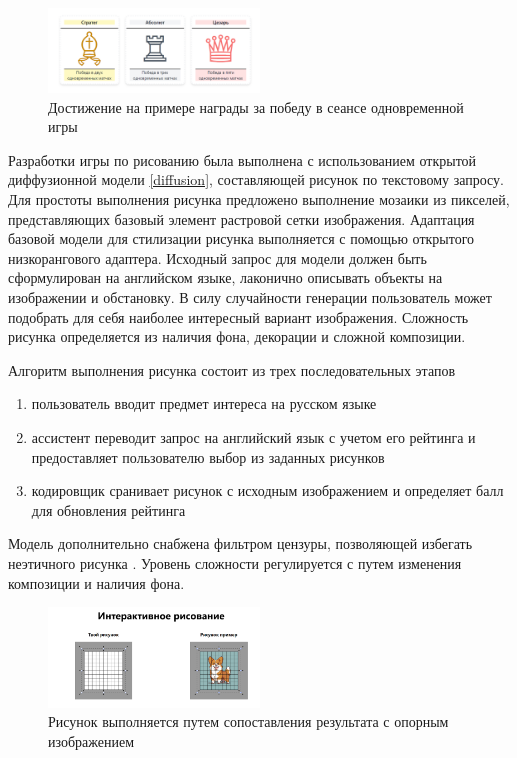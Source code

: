 \begin{figure}[h]
    \centering
    \includegraphics[width=0.5\textwidth]{assets/work/games/achieve.png}
    \caption{Достижение на примере награды за победу в сеансе одновременной игры}
    \label{achievement}
\end{figure}

Разработки игры по рисованию была выполнена с использованием открытой диффузионной модели \ref{diffusion},
составляющей рисунок по текстовому запросу. Для простоты выполнения рисунка предложено выполнение мозаики из
пикселей, представляющих базовый элемент растровой сетки изображения. Адаптация базовой модели для стилизации
рисунка выполняется с помощью открытого низкорангового адаптера. Исходный запрос для модели должен быть 
сформулирован на английском языке, лаконично описывать объекты на изображении и обстановку. 
В силу случайности генерации пользователь может подобрать для себя наиболее интересный вариант изображения.
Сложность рисунка определяется из наличия фона, декорации и сложной композиции. 

Алгоритм выполнения рисунка состоит из трех последовательных этапов \begin{enumerate}
    \item пользователь вводит предмет интереса на русском языке
    \item ассистент переводит запрос на английский язык с учетом его рейтинга и предоставляет пользователю выбор из заданных рисунков
    \item кодировщик сранивает рисунок с исходным изображением и определяет балл для обновления рейтинга
\end{enumerate}

Модель дополнительно снабжена фильтром цензуры, позволяющей избегать неэтичного рисунка \cite{radford2021learning}.
Уровень сложности регулируется с  путем изменения композиции и наличия фона.
\begin{figure}[h]
    \centering
    \includegraphics[width=0.5\textwidth]{assets/work/games/draw.excalidraw.png}
    \caption{Рисунок выполняется путем сопоставления результата с опорным изображением}
    \label{draw}
\end{figure}
